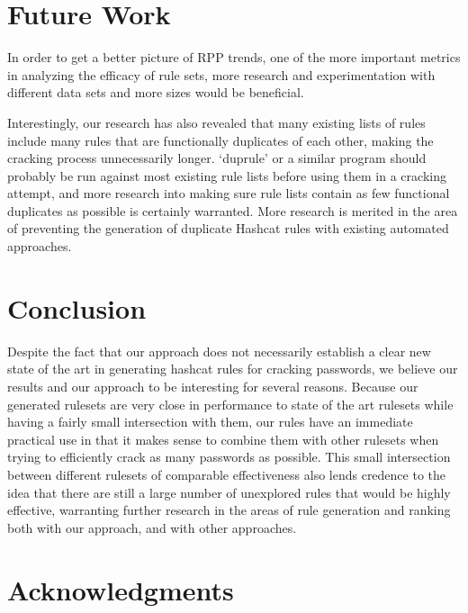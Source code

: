 \documentclass{article}
\begin{document}
\section{Future Work}
\label{sec:future-work}



In order to get a better picture of RPP trends, one of the more important
metrics
in analyzing the efficacy of rule sets, more research and experimentation with
different data sets and more sizes would be beneficial.

Interestingly, our research has also revealed that many existing lists of rules
include many rules that are functionally duplicates of each other, making the
cracking process unnecessarily longer. `duprule' or a similar program should
probably be run against most existing rule lists before using them in a cracking
attempt, and more research into making sure rule lists contain as few functional
duplicates as possible is certainly warranted. More research is merited in
the area of preventing the generation of duplicate Hashcat rules with
existing automated approaches.

\section{Conclusion}

Despite the fact that our approach does not necessarily establish a clear new
state of the art in generating hashcat rules for cracking passwords, we believe
our results and our approach to be interesting for several reasons. Because
our generated rulesets are very close in performance to state of the art rulesets
while having a fairly small intersection with them, our rules have an immediate practical use
in that it makes sense to combine them with other rulesets when trying to efficiently
crack as many passwords as possible. This small intersection between different rulesets
of comparable effectiveness also lends credence to the idea that there are still
a large number of unexplored rules that would be highly effective, warranting
further research in the areas of rule generation and ranking both with our approach,
and with other approaches.

\section*{Acknowledgments}
\end{document}
